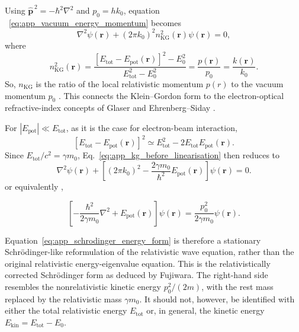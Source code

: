 Using $\hat{\mathbf p}^{\,2}=-\hbar^2\nabla^2$ and
$p_0=h k_0$, equation ~\eqref{eq:app_vacuum_energy_momentum} becomes
\begin{equation}
\nabla^2\psi(\mathbf r)
+
(2\pi k_0)^2n_{\mathrm{KG}}^2(\mathbf r)\psi(\mathbf r)
=0,
\label{eq:app_kg_helmholtz_form}
\end{equation}
where
\begin{equation}
n_{\mathrm{KG}}^2(\mathbf r)
=
\frac{
\left[E_{\mathrm{tot}}-E_{\mathrm{pot}}(\mathbf r)\right]^2-E_0^2
} {
E_{\mathrm{tot}}^2-E_0^2
} = \frac{p(\mathbf r)}{p_0}=\frac{k(\mathbf r)}{k_0}
.
\label{eq:app_kg_refractive_index}
\end{equation}
So, $n_{\mathrm{KG}}$ is the ratio of the local relativistic 
momentum $p(r)$  to the vacuum momentum $p_0$ . This connects the Klein--Gordon form to the
electron-optical refractive-index concepts of Glaser and Ehrenberg--Siday
\cite{Glaser1933,Ehrenberg-Siday1949}.

For $|E_{\mathrm{pot}}|\ll E_{\mathrm{tot}}$, as it is the case for electron-beam interaction, 
\begin{equation}
\left[E_{\mathrm{tot}}-E_{\mathrm{pot}}(\mathbf r)\right]^2
\simeq
E_{\mathrm{tot}}^2
-
2E_{\mathrm{tot}}E_{\mathrm{pot}}(\mathbf r).
\label{eq:app_linearised_energy}
\end{equation}
Since $E_{\mathrm{tot}}/c^2=\gamma m_0$, Eq.~\eqref{eq:app_kg_before_linearisation}
then reduces to
\begin{equation}
\nabla^2\psi(\mathbf r)
+
\left[
(2\pi k_0)^2
-
\frac{2\gamma m_0}{\hbar^2}E_{\mathrm{pot}}(\mathbf r)
\right]\psi(\mathbf r)
=0.
\label{eq:app_corrected_schrodinger}
\end{equation} or equivalently , 

\begin{equation}
\left[
-\frac{\hbar^2}{2\gamma m_0}\nabla^2
+
E_{\mathrm{pot}}(\mathbf r)
\right]\psi(\mathbf r)
=
\frac{p_0^2}{2\gamma m_0}\psi(\mathbf r).
\label{eq:app_schrodinger_energy_form}
\end{equation}

Equation~\eqref{eq:app_schrodinger_energy_form} is
therefore a stationary Schrödinger-like reformulation of the relativistic
wave equation, rather than the original relativistic energy-eigenvalue
equation.
This is the relativistically corrected
Schr\"odinger form as deduced by Fujiwara. 
The right-hand side resembles the nonrelativistic kinetic energy
$p_0^2/(2m)$, with the rest mass replaced by the relativistic mass
$\gamma m_0$. It should not, however, be identified with either the total
relativistic energy $E_{\mathrm{tot}}$ or, in general, the kinetic energy
$E_{\mathrm{kin}}=E_{\mathrm{tot}}-E_0$.

